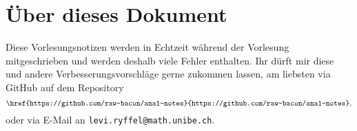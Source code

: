 \documentclass[../main.tex]{subfiles}
\begin{document}
\section*{Über dieses Dokument}
Diese Vorlesungsnotizen werden in Echtzeit während der Vorlesung mitgeschrieben
und werden deshalb viele Fehler enthalten.
Ihr dürft mir diese und andere Verbesserungsvorschläge
gerne zukommen lassen, am liebsten via GitHub
auf dem Repository
\[
\texttt{\href{https://github.com/raw-bacon/ana1-notes}{https://github.com/raw-bacon/ana1-notes}},
\]
oder via E-Mail an \texttt{levi.ryffel@math.unibe.ch}.
\end{document}
